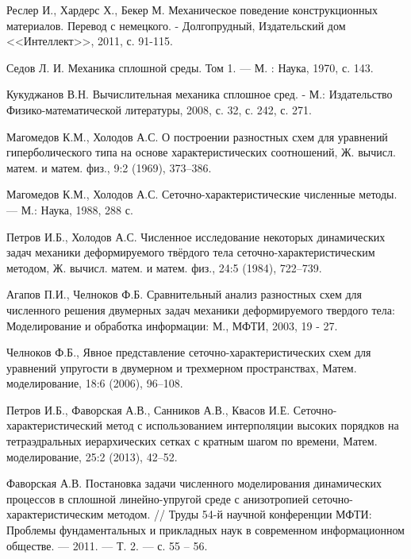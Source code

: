 \begin{thebibliography}{99}

 Реслер И., Хардерс Х., Бекер М. Механическое поведение конструкционных материалов. Перевод с немецкого. - Долгопрудный, Издательский дом <<Интеллект>>, 2011, с. 91-115.

 Седов Л. И. Механика сплошной среды. Том 1. — М. : Наука, 1970, с. 143.

 Кукуджанов В.Н. Вычислительная механика сплошное сред. - М.: Издательство Физико-математической литературы, 2008, с. 32, с. 242, с. 271.

 Магомедов К.М., Холодов А.С. О построении разностных схем для уравнений гиперболического типа на основе характеристических соотношений, Ж. вычисл. матем. и матем. физ., 9:2 (1969), 373–386.

 Магомедов К.М., Холодов А.С. Сеточно-характеристические численные методы. — М.: Наука, 1988, 288 с.

 Петров И.Б., Холодов А.С. Численное исследование некоторых динамических задач механики деформируемого твёрдого тела сеточно-характеристическим методом, Ж. вычисл. матем. и матем. физ., 24:5 (1984), 722–739.

 Агапов П.И., Челноков Ф.Б. Сравнительный анализ разностных схем для численного решения двумерных задач механики деформируемого твердого тела: Моделирование и обработка информации: М., МФТИ, 2003, 19 - 27.

 Челноков Ф.Б., Явное представление сеточно-характеристических схем для уравнений упругости в двумерном и трехмерном пространствах, Матем. моделирование, 18:6 (2006), 96–108.

 Петров И.Б., Фаворская А.В., Санников А.В., Квасов И.Е. Сеточно-характеристический метод с использованием интерполяции высоких порядков на тетраэдральных иерархических сетках с кратным шагом по времени, Матем. моделирование, 25:2 (2013), 42–52.

 Фаворская А.В. Постановка задачи численного моделирования динамических процессов в сплошной линейно-упругой среде с анизотропией сеточно-характеристическим методом. // Труды 54-й научной конференции МФТИ: Проблемы фундаментальных и прикладных наук в современном информационном обществе. — 2011. — Т. 2. — с. 55 – 56.


\end{thebibliography}
